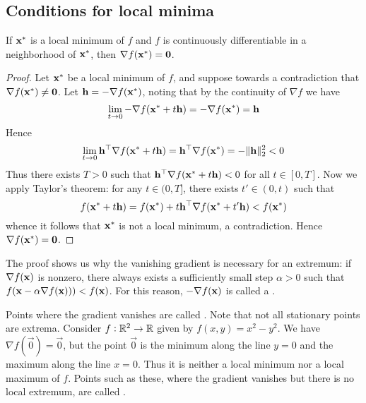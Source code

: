 \subsection{Conditions for local minima}
\begin{proposition}
If $\mathbf{x}^*$ is a local minimum of $f$ and $f$ is continuously differentiable in a neighborhood of $\mathbf{x}^*$, then $\nabla f(\mathbf{x}^*) = \mathbf{0}$.
\end{proposition}
\begin{proof}
Let $\mathbf{x}^*$ be a local minimum of $f$, and suppose towards a contradiction that $\nabla f(\mathbf{x}^*) \neq \mathbf{0}$.
Let $\mathbf{h} = -\nabla f(\mathbf{x}^*)$, noting that by the continuity of $\nabla f$ we have
\[\lim_{t \to 0} -\nabla f(\mathbf{x}^* + t\mathbf{h}) = -\nabla f(\mathbf{x}^*) = \mathbf{h}\]
Hence
\[\lim_{t \to 0} \mathbf{h}^\top\nabla f(\mathbf{x}^* + t\mathbf{h}) = \mathbf{h}^\top\nabla f(\mathbf{x}^*) = -\|\mathbf{h}\|_2^2 < 0\]
Thus there exists $T > 0$ such that $\mathbf{h}^\top\nabla f(\mathbf{x}^* + t\mathbf{h}) < 0$ for all $t \in [0,T]$.
Now we apply Taylor's theorem: for any $t \in (0,T]$, there exists $t' \in (0,t)$ such that
\[f(\mathbf{x}^* + t\mathbf{h}) = f(\mathbf{x}^*) + t\mathbf{h}^\top \nabla f(\mathbf{x}^* + t'\mathbf{h}) < f(\mathbf{x}^*)\]
whence it follows that $\mathbf{x}^*$ is not a local minimum, a contradiction.
Hence $\nabla f(\mathbf{x}^*) = \mathbf{0}$.
\end{proof}
The proof shows us why the vanishing gradient is necessary for an extremum: if $\nabla f(\mathbf{x})$ is nonzero, there always exists a sufficiently small step $\alpha > 0$ such that $f(\mathbf{x} - \alpha\nabla f(\mathbf{x}))) < f(\mathbf{x})$.
For this reason, $-\nabla f(\mathbf{x})$ is called a .

Points where the gradient vanishes are called .
Note that not all stationary points are extrema.
Consider $f : \mathbb{R}^2 \to \mathbb{R}$ given by $f(x,y) = x^2 - y^2$.
We have $\nabla f(\vec{0}) = \vec{0}$, but the point $\vec{0}$ is the minimum along the line $y = 0$ and the maximum along the line $x = 0$.
Thus it is neither a local minimum nor a local maximum of $f$.
Points such as these, where the gradient vanishes but there is no local extremum, are called .

